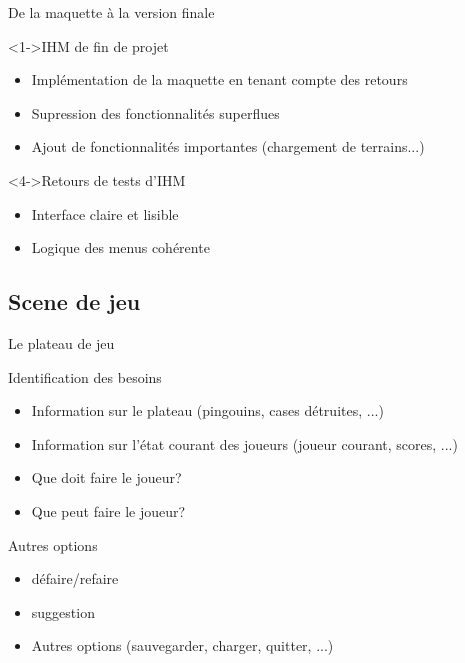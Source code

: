 \documentclass{beamer}
\begin{document}
\begin{frame}{De la maquette à la version finale}
  \begin{block}<1->{IHM de fin de projet}
	\begin{itemize}
	\item <1-> Implémentation de la maquette en tenant compte des retours
	\item <2-> Supression des fonctionnalités superflues
	\item <3-> Ajout de fonctionnalités importantes (chargement de terrains...)
  	\end{itemize}
  \end{block}
  \begin{block}<4->{Retours de tests d'IHM}
    \begin{itemize}
	\item <4-> Interface claire et lisible
	\item <5-> Logique des menus cohérente
	\end{itemize}
  \end{block}
\end{frame}

\subsection{Scene de jeu}

\begin{frame}{Le plateau de jeu}
  \begin{block}{Identification des besoins}
    \begin{itemize}
    \item <1-> Information sur le plateau (pingouins, cases détruites, ...)
    \item <2-> Information sur l'état courant des joueurs (joueur courant, scores, ...)
    \item <3-> Que doit faire le joueur?
    \item <4-> Que peut faire le joueur?
    \end{itemize}
  \end{block}
\end{frame}

\begin{frame}{}
  \begin{block}{Autres options}
    \begin{itemize}
    \item <1-> défaire/refaire
    \item <2-> suggestion
    \item <3-> Autres options (sauvegarder, charger, quitter, ...)
    \end{itemize}
  \end{block}
\end{frame}
\end{document}
